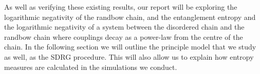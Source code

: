 

As well as verifying these existing results, our report will be exploring the logarithmic negativity of the randbow chain, and the entanglement entropy and the logarithmic negativity of a system between the disordered chain and the randbow chain where couplings decay as a power-law from the centre of the chain. In the following section we will outline the principle model that we study as well, as the SDRG procedure. This will also allow us to explain how entropy measures are calculated in the simulations we conduct.